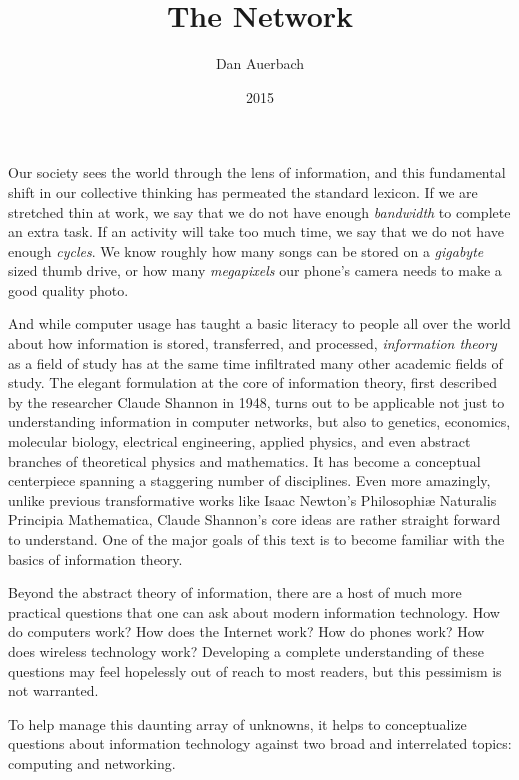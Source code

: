 \documentclass[UTF8]{book}
\begin{document}
\begin{CJK}{UTF8}{gbsn}

\title{The Network}
\author{Dan Auerbach}
\date{2015}
\maketitle

Our society sees the world through the lens of information, and this fundamental shift in our collective thinking has permeated the standard lexicon. If we are stretched thin at work, we say that we do not have enough \emph{bandwidth} to complete an extra task. If an activity will take too much time, we say that we do not have enough \emph{cycles}. We know roughly how many songs can be stored on a \emph{gigabyte} sized thumb drive, or how many \emph{megapixels} our phone's camera needs to make a good quality photo.

And while computer usage has taught a basic literacy to people all over the world about how information is stored, transferred, and processed, \emph{information theory} as a field of study has at the same time infiltrated many other academic fields of study. The elegant formulation at the core of information theory, first described by the researcher Claude Shannon in 1948, turns out to be applicable not just to understanding information in computer networks, but also to genetics, economics, molecular biology, electrical engineering, applied physics, and even abstract branches of theoretical physics and mathematics. It has become a conceptual centerpiece spanning a staggering number of disciplines. Even more amazingly, unlike previous transformative works like Isaac Newton's Philosophiæ Naturalis Principia Mathematica, Claude Shannon's core ideas are rather straight forward to understand. One of the major goals of this text is to become familiar with the basics of information theory.

Beyond the abstract theory of information, there are a host of much more practical questions that one can ask about modern information technology. How do computers work? How does the Internet work? How do phones work? How does wireless technology work? Developing a complete understanding of these questions may feel hopelessly out of reach to most readers, but this pessimism is not warranted.

To help manage this daunting array of unknowns, it helps to conceptualize questions about information technology against two broad and interrelated topics: computing and networking.


\end{CJK}
\end{document}
